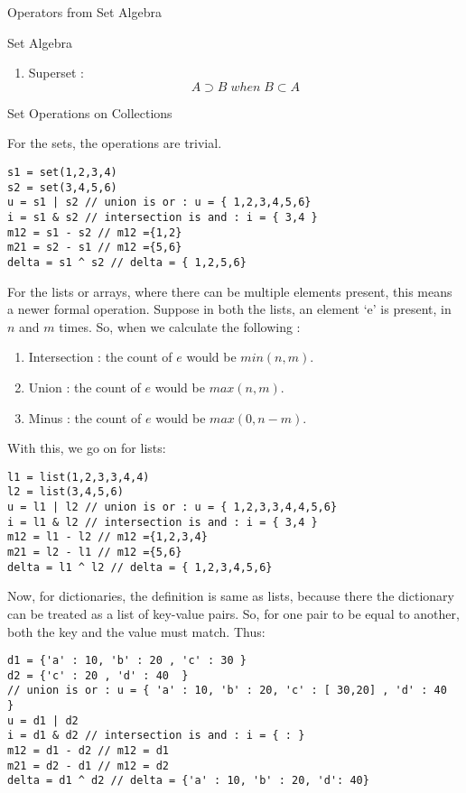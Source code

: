 \begin{section}{Operators from Set Algebra}
\begin{subsection}{Set Algebra}
\begin{enumerate}
{\begin{enumerate}
\item{ Superset : 
$$
A \supset B \; when \; B \subset A 
$$
}
\end{enumerate}}
\end{enumerate}
\end{subsection}

\begin{subsection}{Set Operations on Collections}

For the sets, the operations are trivial.
\begin{lstlisting}[style=JexlStyle]
s1 = set(1,2,3,4)
s2 = set(3,4,5,6)
u = s1 | s2 // union is or : u = { 1,2,3,4,5,6}
i = s1 & s2 // intersection is and : i = { 3,4 }
m12 = s1 - s2 // m12 ={1,2}
m21 = s2 - s1 // m12 ={5,6}
delta = s1 ^ s2 // delta = { 1,2,5,6}
\end{lstlisting}

For the lists or arrays, where there can be multiple elements present, 
this means a newer formal operation.
Suppose in both the lists, an element `e' is present, in $n$ and $m$ times.
So, when we calculate the following :
\begin{enumerate}
\item{Intersection :
  the count of $e$ would be $min(n,m)$.
}
\item{Union :
  the count of $e$ would be $max(n,m)$.
}
\item{Minus :
  the count of $e$ would be $max(0,n-m)$.
}

\end{enumerate}
With this, we go on for lists:

\begin{lstlisting}[style=JexlStyle]
l1 = list(1,2,3,3,4,4)
l2 = list(3,4,5,6)
u = l1 | l2 // union is or : u = { 1,2,3,3,4,4,5,6}
i = l1 & l2 // intersection is and : i = { 3,4 }
m12 = l1 - l2 // m12 ={1,2,3,4}
m21 = l2 - l1 // m12 ={5,6}
delta = l1 ^ l2 // delta = { 1,2,3,4,5,6}
\end{lstlisting}

Now, for dictionaries, the definition is same as lists, 
because there the dictionary can be treated as a list of key-value pairs.
So, for one pair to be equal to another, both the key and the value must match.
Thus:

\begin{lstlisting}[style=JexlStyle]
d1 = {'a' : 10, 'b' : 20 , 'c' : 30 }
d2 = {'c' : 20 , 'd' : 40  }
// union is or : u = { 'a' : 10, 'b' : 20, 'c' : [ 30,20] , 'd' : 40  }
u = d1 | d2 
i = d1 & d2 // intersection is and : i = { : } 
m12 = d1 - d2 // m12 = d1 
m21 = d2 - d1 // m12 = d2
delta = d1 ^ d2 // delta = {'a' : 10, 'b' : 20, 'd': 40}
\end{lstlisting}
\end{subsection}


\end{section}
